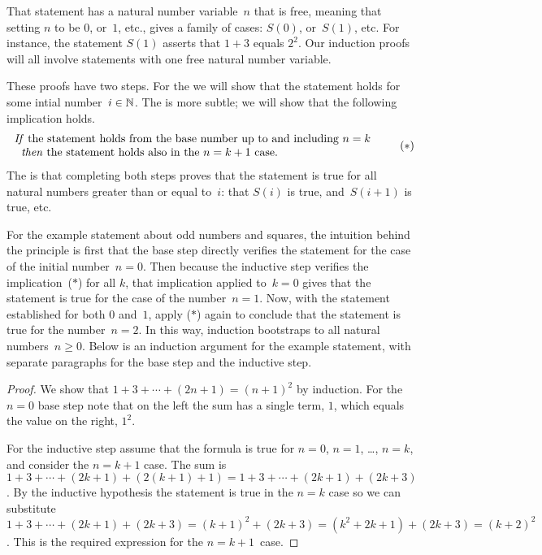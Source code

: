 \documentclass{ibl}  %
\begin{document}
That statement has a natural number variable~$n$ that is free, 
meaning that setting $n$ to be $0$, or~$1$, etc., gives 
a family of cases: $S(0)$, or~$S(1)$, 
etc.  
For instance, the statement $S(1)$ asserts that $1+3$ equals $2^2$.
Our induction proofs will all involve statements with one free 
natural number variable.

These proofs have two steps.
For the  
we will show that the statement holds for some intial number~$i\in\mathbb{N}$.
The  is more subtle;
we will show that the following implication holds.
\begin{equation*}
  \begin{tabular}{l} 
  \textit{If} the statement holds from the
   base number up to and including $n=k$  \\
  \hspace*{0.618em}\textit{then} the statement holds also in the~$n=k+1$ case.
  \end{tabular}
  \tag{$*$}
\end{equation*}
The  is that
completing both steps proves 
that the statement is true for all natural
numbers greater than or equal to~$i$: 
that $S(i)$ is true, and~$S(i+1)$ is true, etc.

For the example statement about odd numbers and squares, 
the intuition behind the principle is first that the base step
directly verifies the statement for the case of the initial number~$n=0$.
Then because the inductive step verifies the implication~($*$) for all $k$, 
that implication applied to~$k=0$ gives 
that the statement is true for the case of the number~$n=1$. 
Now, with the statement established for both $0$ and~$1$, 
apply ($*$) again to conclude that the statement is true for the number~$n=2$.
In this way, induction bootstraps to all natural numbers~$n\geq 0$.
Below is an induction argument for the example statement, 
with separate paragraphs for the base step and the inductive step.

\begin{proof}
  We show that $1+3+\cdots+(2n+1)=(n+1)^2$ by induction.
  For the $n=0$ base step note that on the left the sum has a single term, $1$,
  which equals the value on the right, $1^2$.

  For the inductive step assume that the 
  formula is true for $n=0$, $n=1$, \ldots, $n=k$, and 
  consider the $n=k+1$ case.
  The sum is $1+3+\cdots+(2k+1)+(2(k+1)+1)=1+3+\cdots+(2k+1)+(2k+3)$.
  By the inductive hypothesis the statement is true in the $n=k$ case
  so we can substitute 
  $1+3+\cdots+(2k+1)+(2k+3)=(k+1)^2+(2k+3)=(k^2+2k+1)+(2k+3)=(k+2)^2$.
  This is the required expression for the $n=k+1$~case.
\end{proof}
\end{document}
